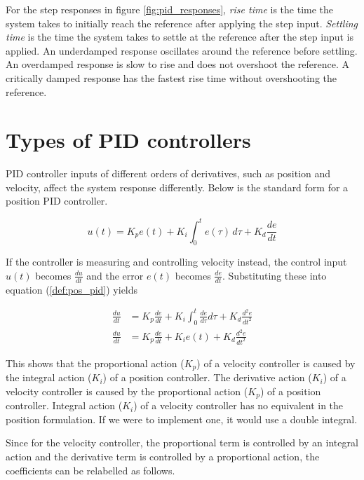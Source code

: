 For the step responses in figure \ref{fig:pid_responses}, \textit{rise time} is
the time the system takes to initially reach the \gls{reference} after applying
the step input. \textit{Settling time} is the time the system takes to settle at
the \gls{reference} after the step input is applied. An underdamped response
oscillates around the \gls{reference} before settling. An overdamped response is
slow to rise and does not overshoot the \gls{reference}. A critically damped
response has the fastest rise time without overshooting the \gls{reference}.

\section{Types of PID controllers}

PID controller inputs of different orders of derivatives, such as position and
velocity, affect the \gls{system} response differently. Below is the standard
form for a position PID controller.

\begin{definition}
  \begin{equation}
    u(t) = K_p e(t) + K_i \int_0^t e(\tau) \,d\tau + K_d \frac{de}{dt}
    \label{def:pos_pid}
  \end{equation}
\end{definition}

If the controller is measuring and controlling velocity instead, the control
input $u(t)$ becomes $\frac{du}{dt}$ and the error $e(t)$ becomes
$\frac{de}{dt}$. Substituting these into equation (\ref{def:pos_pid}) yields

\begin{align}
  \frac{du}{dt} &= K_p \frac{de}{dt} + K_i \int_0^t \frac{de}{d\tau} d\tau +
    K_d \frac{d^2e}{dt^2} \nonumber \\
  \frac{du}{dt} &= K_p \frac{de}{dt} + K_i e(t) + K_d \frac{d^2e}{dt^2}
\end{align}

This shows that the proportional action ($K_p$) of a velocity controller is
caused by the integral action ($K_i$) of a position controller. The derivative
action ($K_i$) of a velocity controller is caused by the proportional action
($K_p$) of a position controller. Integral action ($K_i$) of a velocity
controller has no equivalent in the position formulation. If we were to
implement one, it would use a double integral.

Since for the velocity controller, the proportional term is controlled by an
integral action and the derivative term is controlled by a proportional action,
the coefficients can be relabelled as follows.

